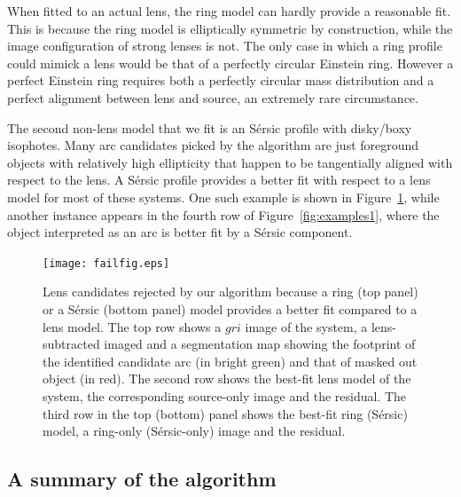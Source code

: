 \documentclass[a4paper,fleqn,usenatbib]{mnras}
\def\Fref#1{Figure~\ref{#1}\xspace}
\begin{document}
When fitted to an actual lens, the ring model can hardly provide a reasonable fit. This is because the ring model is elliptically symmetric by construction, while the image configuration of strong lenses is not. The only case in which a ring profile could mimick a lens would be that of a perfectly circular Einstein ring. However a perfect Einstein ring requires both a perfectly circular mass distribution and a perfect alignment between lens and source, an extremely rare circumstance.

The second non-lens model that we fit is an S\'{e}rsic profile with disky/boxy isophotes. 
Many arc candidates picked by the algorithm are just foreground objects with relatively high ellipticity that happen to be tangentially aligned with respect to the lens.
A S\'{e}rsic profile provides a better fit with respect to a lens model for most of these systems.
One such example is shown in \Fref{fig:fail}, while another instance appears in the fourth row of \Fref{fig:examples1}, where the object interpreted as an arc is better fit by a S\'{e}rsic component.
%
\begin{figure}
 \texttt{[image: failfig.eps]}
 \label{fig:fail}
  \caption{Lens candidates rejected by our algorithm because a ring (top panel) or a S\'{e}rsic (bottom panel) model provides a better fit compared to a lens model. The top row shows a $gri$ image of the system, a lens-subtracted imaged and a segmentation map showing the footprint of the identified candidate arc (in bright green) and that of masked out object (in red).
The second row shows the best-fit lens model of the system, the corresponding source-only image and the residual.
The third row in the top (bottom) panel shows the best-fit ring (S\'{e}rsic) model, a ring-only (S\'{e}rsic-only) image and the residual.
}
\end{figure}


\subsection{A summary of the algorithm}
\end{document}
